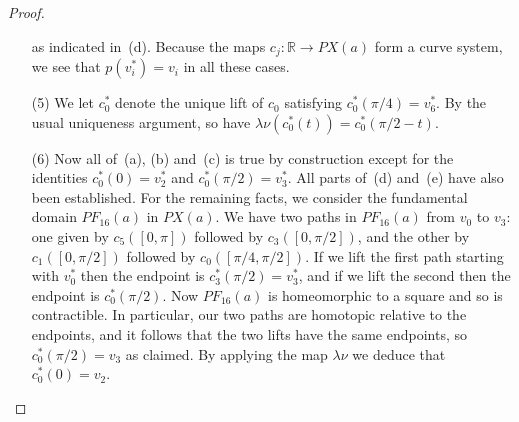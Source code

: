 \documentclass[reqno]{amsart}
\newcommand{\lm}        {\lambda}
\newcommand{\R}         {{\mathbb{R}}}
\renewcommand{\:}{\colon}
\theoremstyle{definition}
\begin{document}
\begin{proof}
\begin{itemize}
   as indicated in~(d).  Because the maps $c_j\:\R\to PX(a)$ form a
   curve system, we see that $p(v^*_i)=v_i$ in all these cases.
  \item[(5)] We let $c^*_0$ denote the unique lift of $c_0$ satisfying
   $c^*_0(\pi/4)=v^*_6$.   By the usual uniqueness argument, so have
   $\lm\nu(c^*_0(t))=c^*_0(\pi/2-t)$.
  \item[(6)] Now all of~(a), (b) and~(c) is true by construction
   except for the identities $c^*_0(0)=v^*_2$ and
   $c^*_0(\pi/2)=v^*_3$.  All parts of~(d) and~(e) have also been
   established.  For the remaining facts, we consider the fundamental
   domain $PF_{16}(a)$ in $PX(a)$.  We have two paths in $PF_{16}(a)$
   from $v_0$ to $v_3$: one given by $c_5([0,\pi])$ followed by
   $c_3([0,\pi/2])$, and the other by $c_1([0,\pi/2])$ followed by
   $c_0([\pi/4,\pi/2])$.  If we lift the first path starting with
   $v^*_0$ then the endpoint is $c^*_3(\pi/2)=v^*_3$, and if we lift
   the second then the endpoint is $c_0^*(\pi/2)$.  Now $PF_{16}(a)$
   is homeomorphic to a square and so is contractible.  In particular,
   our two paths are homotopic relative to the endpoints, and it
   follows that the two lifts have the same endpoints, so
   $c_0^*(\pi/2)=v_3$ as claimed.  By applying the map $\lm\nu$ we
   deduce that $c_0^*(0)=v_2$.
 \end{itemize}
\end{proof}
\end{document}
